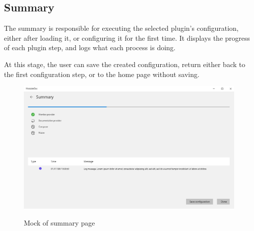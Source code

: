 \subsection{Summary}

The summary is responsible for executing the selected plugin's configuration, either after loading it, or configuring it for the first time. It displays the progress of each plugin step, and logs what each process is doing.

At this stage, the user can save the created configuration, return either back to the first configuration step, or to the home page without saving.

\begin{figure}[H]
    \includegraphics[width=\linewidth]{img/mockSummary.png}
    \label{fig:summaryPage}
    \caption{Mock of summary page}
\end{figure}